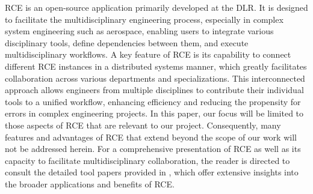 \ac{RCE} is an open-source application primarily developed at the \ac{DLR}. It is designed to facilitate the multidisciplinary engineering process, especially in complex system engineering such as aerospace, enabling users to integrate various disciplinary tools, define dependencies between them, and execute multidisciplinary workflows\cite{BODEN2021100759}. A key feature of \ac{RCE} is its capability to connect different \ac{RCE} instances in a distributed systems manner, which greatly facilitates collaboration across various departments and specializations. This interconnected approach allows engineers from multiple disciplines to contribute their individual tools to a unified workflow, enhancing efficiency and reducing the propensity for errors in complex engineering projects. In this paper, our focus will be limited to those aspects of \ac{RCE} that are relevant to our project. Consequently, many features and advantages of \ac{RCE} that extend beyond the scope of our work will not be addressed herein. For a comprehensive presentation of \ac{RCE} as well as its capacity to facilitate multidisciplinary collaboration, the reader is directed to consult the detailed tool papers provided in \cite{BODEN2021100759,boden2019distributed}, which offer extensive insights into the broader applications and benefits of \ac{RCE}.

